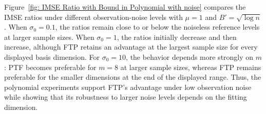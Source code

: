 \documentclass[twoside,11pt]{article}
\begin{document}
Figure~\ref{fig: IMSE Ratio with Bound in Polynomial with noise} compares the IMSE ratios under different observation-noise levels with $\mu=1$ and $B'=\sqrt{\log n}$. When $\sigma_0=0.1$, the ratios remain close to or below the noiseless reference levels at larger sample sizes. When $\sigma_0=1$, the ratios initially decrease and then increase, although FTP retains an advantage at the largest sample size for every displayed basis dimension. For $\sigma_0=10$, the behavior depends more strongly on $m$: PTF becomes preferable for $m=8$ at larger sample sizes, whereas FTP remains preferable for the smaller dimensions at the end of the displayed range. Thus, the polynomial experiments support FTP's advantage under low observation noise while showing that its robustness to larger noise levels depends on the fitting dimension.
\end{document}
